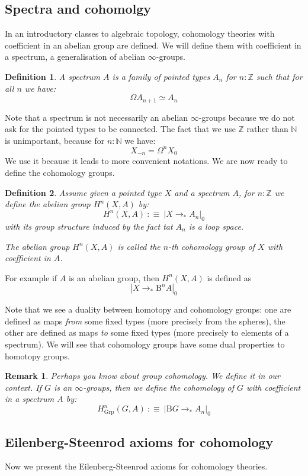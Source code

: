 \documentclass{article}
\newcommand{\sse}[1]{\medbreak \subsection{#1}}
\renewcommand{\r}{\rightarrow}
\newcommand{\Grp}{\mathrm{Grp}}
\newcommand{\B}{\mathrm{B}}
\newtheorem{definition}{Definition}
\newtheorem{remark}{Remark}
\begin{document}
\sse{Spectra and cohomolgy}

In an introductory classes to algebraic topology, cohomology theories with coefficient in an abelian group are defined. We will define them with coefficient in a spectrum, a generalisation of abelian $\infty$-groups.%

\begin{definition}
A spectrum $A$ is a family of pointed types $A_n$ for $n:\mathbb{Z}$ such that for all $n$ we have:
\[\Omega A_{n+1} \simeq A_n\]
\end{definition}

Note that a spectrum is not necessarily an abelian $\infty$-groups because we do not ask for the pointed types to be connected. The fact that we use $\mathbb{Z}$ rather than $\mathbb{N}$ is unimportant, because for $n:\mathbb{N}$ we have: 
\[X_{-n} = \Omega^n X_0\]
We use it because it leads to more convenient notations. We are now ready to define the cohomology groups.

\begin{definition}
Assume given a pointed type $X$ and a spectrum $A$, for $n:\mathbb{Z}$ we define the abelian group $H^n(X,A)$ by: 
\[H^n(X,A)\ :\equiv\ |X\r_* A_n|_0\]
with its group structure induced by the fact tat $A_n$ is a loop space.

The abelian group $H^n(X,A)$ is called the $n$-th cohomology group of $X$ with coefficient in $A$.
\end{definition}

For example if $A$ is an abelian group, then $H^n(X,A)$ is defined as
\[|X\r_* \B^n A|_0\]

Note that we see a duality between homotopy and cohomology groups: one are defined as maps \emph{from} some fixed types (more precisely from the spheres), the other are defined as maps \emph{to} some fixed types (more precisely to elements of a spectrum). We will see that cohomology groups have some dual properties to homotopy groups. 

\begin{remark}
Perhaps you know about group cohomology. We define it in our context. If $G$ is an $\infty$-groups, then we define the cohomology of $G$ with coefficient in a spectrum $A$ by:
\[H^n_\Grp(G,A) \ :\equiv\ |\B G \r_* A_n|_0\]
\end{remark}


\sse{Eilenberg-Steenrod axioms for cohomology}

Now we present the Eilenberg-Steenrod axioms for cohomology theories.
\end{document}
